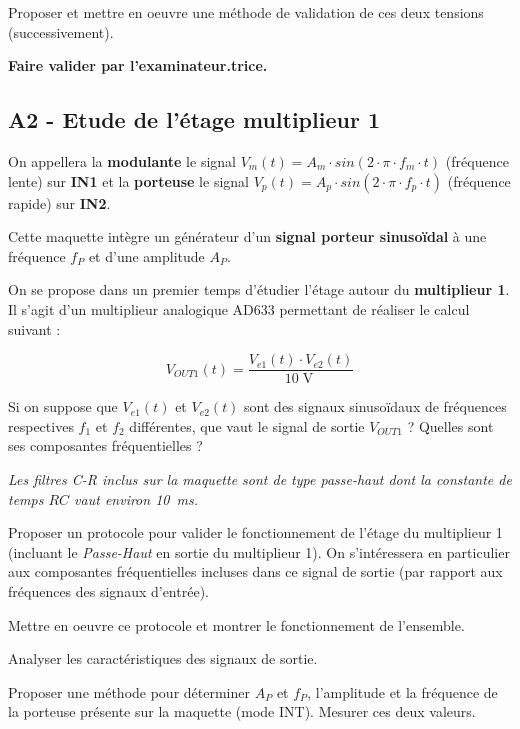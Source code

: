 \documentclass[a4paper,11pt]{article}
\begin{document}
\Real Proposer et mettre en oeuvre une méthode de validation de ces deux tensions (successivement).

\bigskip	
	
	\textbf{Faire valider par l'examinateur.trice.}	

\subsection*{A2 - Etude de l'étage multiplieur 1}



On appellera la \textbf{modulante} le signal $V_m(t) = A_m \cdot sin(2 \cdot \pi \cdot f_m \cdot t)$ (fréquence lente) sur  \textsc{\textbf{IN1}} et la \textbf{porteuse} le signal $V_p(t) = A_p \cdot sin(2 \cdot \pi \cdot f_p \cdot t)$ (fréquence rapide) sur  \textsc{\textbf{IN2}}.

Cette maquette intègre un générateur d'un \textbf{signal porteur sinusoïdal} à une fréquence $f_P$ et d'une amplitude $A_P$.

\bigskip

	On se propose dans un premier temps d'étudier l'étage autour du \textbf{multiplieur 1}.	Il s'agit d'un multiplieur analogique AD633 permettant de réaliser le calcul suivant : 
	
	$$V_{OUT1}(t) = \frac{V_{e1}(t) \cdot V_{e2}(t)}{10\operatorname{V}}$$
	
\Real Si on suppose que $V_{e1}(t)$ et $V_{e2}(t)$ sont des signaux sinusoïdaux de fréquences respectives $f_1$ et $f_2$ différentes, que vaut le signal de sortie $V_{OUT1}$ ? Quelles sont ses composantes fréquentielles ?

\bigskip

\textit{Les filtres C-R inclus sur la maquette sont de type passe-haut dont la constante de temps $RC$ vaut environ 10~ms.}

\bigskip

\Real Proposer un protocole pour valider le fonctionnement de l'étage du multiplieur 1 (incluant le \textit{Passe-Haut} en sortie du multiplieur 1). On s'intéressera en particulier aux composantes fréquentielles incluses dans ce signal de sortie (par rapport aux fréquences des signaux d'entrée).

\Real Mettre en oeuvre ce protocole et montrer le fonctionnement de l'ensemble.

\Real Analyser les caractéristiques des signaux de sortie.

\Real Proposer une méthode pour déterminer $A_P$ et $f_P$, l'amplitude et la fréquence de la porteuse présente sur la maquette (mode INT). Mesurer ces deux valeurs.
\end{document}

